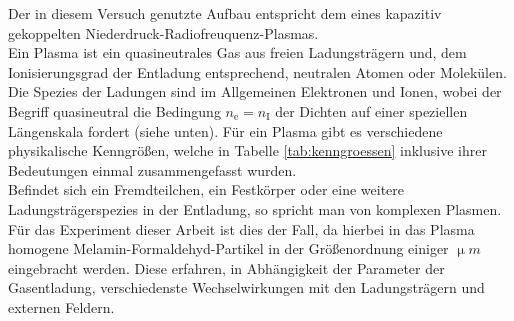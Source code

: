 \documentclass[numbers=noenddot,a4paper,notitlepage,twoside,BCOR15mm]{scrbook}
\newcommand{\ix}[1]{_\text{#1}}
\begin{document}
			Der in diesem Versuch genutzte Aufbau entspricht dem eines kapazitiv gekoppelten Niederdruck-Radiofreuquenz-Plasmas.\\
			Ein Plasma ist ein quasineutrales Gas aus freien Ladungsträgern und, dem Ionisierungsgrad der Entladung entsprechend, neutralen Atomen oder Molekülen. Die Spezies der Ladungen sind im Allgemeinen Elektronen und Ionen, wobei der Begriff quasineutral die Bedingung $n\ix{e}=n\ix{I}$ der Dichten auf einer speziellen Längenskala fordert (siehe unten). Für ein Plasma gibt es verschiedene physikalische Kenngrößen, welche in Tabelle \ref{tab:kenngroessen} inklusive ihrer Bedeutungen einmal zusammengefasst wurden.\\
			Befindet sich ein Fremdteilchen, ein Festkörper oder eine weitere Ladungsträgerspezies in der Entladung, so spricht man von komplexen Plasmen. Für das Experiment dieser Arbeit ist dies der Fall, da hierbei in das Plasma homogene Melamin-Formaldehyd-Partikel in der Größenordnung einiger $\unit{\upmu m}$ eingebracht werden. Diese erfahren, in Abhängigkeit der Parameter der Gasentladung, verschiedenste Wechselwirkungen mit den Ladungsträgern und externen Feldern.
\end{document}
